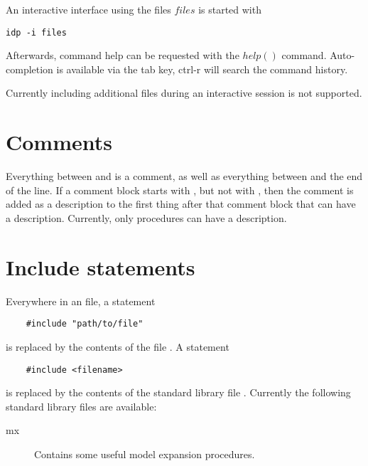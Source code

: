 \documentclass[a4]{article}
\begin{document}
An interactive interface using the files $files$ is started with 
\begin{lstlisting}
idp -i files
\end{lstlisting}

Afterwards, command help can be requested with the $help()$ command. Auto-completion is available via the tab key, ctrl-r will search the command history.

Currently including additional files during an interactive session is not supported.

\section{Comments}

Everything between \code{/*} and \code{*/} is a comment, as well as everything between \code{//} and the end of the line.  If a comment block starts with \code{/**}, but not with \code{/***}, then the comment is added as a description to the first thing after that comment block that can have a description.  Currently, only procedures can have a description.




\section{Include statements}

Everywhere in an \idp file, a statement 
\begin{lstlisting}
	#include "path/to/file"
\end{lstlisting}
is replaced by the contents of the file .
A statement
\begin{lstlisting}
	#include <filename>
\end{lstlisting}

is replaced by the contents of the standard library file .  Currently the following standard library files are available:
\begin{description}
\item[mx] Contains some useful model expansion procedures.
\end{description}




\end{document}
